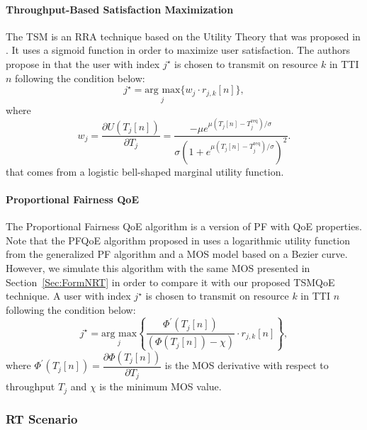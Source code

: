 \documentclass[12pt]{article}
\newcommand{\SecRef}[1]{Section~\ref{#1}}
\begin{document}
\paragraph{Throughput-Based Satisfaction Maximization\\}
The \ac{TSM} is an RRA technique based on the Utility Theory that was proposed in \cite{Rodrigues2014_Wiley}. It uses a sigmoid function in order to maximize user satisfaction. The authors propose in \cite{Rodrigues2014_Wiley} that the user with index $j^\star$ is chosen to transmit on resource $k$ in \ac{TTI} $n$ following the condition below:
%  
\begin{equation}
\label{Eq:TSMArgmax}
j^{\star} = \underset{j}{\text{arg max}}\Big\{w_j \cdot {r_{j, k}[n]}\Big \},
\end{equation}
%
where
%
\begin{equation}
\label{TSMMarginal}
w_{j} = \dfrac{\partial U\left(T_{j}[n]\right)}{\partial T_{j}} = \dfrac{- \mu  e^{\mu \left(T_{j}[n] - T_{j}^{\text{req}}\right) / \sigma}}{\sigma \left(1 + e^{\mu (T_{j}[n] - T_{j}^{\text{req}}) / \sigma}\right)^{2}}.
\end{equation}
%
that comes from a logistic bell-shaped marginal utility function.  

\paragraph{Proportional Fairness QoE\\}
The Proportional Fairness \ac{QoE} algorithm  is a version of \ac{PF} with \ac{QoE} properties. Note that the PFQoE algorithm proposed in \cite{cho2015qoe}  uses a logarithmic utility function from the generalized PF algorithm and a MOS model based on a Bezier curve. However, we simulate this algorithm with the same MOS presented in \SecRef{Sec:FormNRT} in order to compare it with our proposed TSMQoE technique. A user with index $j^\star$ is chosen to transmit on resource $k$ in \ac{TTI} $n$ following the condition below:
%
\begin{equation}
\label{Eq:PFQoEArgmax}
j^{\star} = \underset{j}{\text{arg max}} \left\{ {\dfrac{  \Phi^{'}\left(T_j[n]\right) }{\left(\Phi\left(T_j[n]\right) - \chi\right)} \cdot r_{j, k}[n]} \right\},
\end{equation}
%
where $\Phi^{'}\left(T_j[n]\right) = \dfrac{\partial\Phi\left(T_j[n]\right)}{\partial T_j}$ is the \ac{MOS} derivative  with respect to throughput $T_j$ and $\chi$ is the minimum MOS value.  
\subsubsection{\ac{RT} Scenario}
\end{document}
